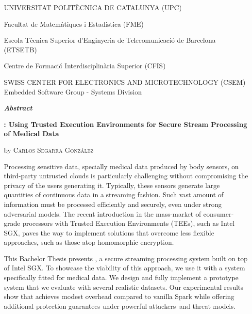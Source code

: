 \vspace*{0.5cm}
\begin{center}
    \large
    UNIVERSITAT POLIT\`ECNICA DE CATALUNYA (UPC) 

    \normalsize
    Facultat de Matem\`atiques i Estad\'istica (FME)

    Escola T\`ecnica Superior d'Enginyeria de Telecomunicaci\'o de Barcelona (ETSETB)

    Centre de Formaci\'o Interdisciplin\`aria Superior (CFIS)

    \vspace{0.5cm}

    \large
    SWISS CENTER FOR ELECTRONICS AND MICROTECHNOLOGY (CSEM)
    \normalsize
    Embedded Software Group - Systems Division
    
    \vspace{0.5cm}

    \LARGE
    \textit{\textbf{Abstract}} \label{sec:abstract}

    \vspace{0.5cm}

    \large
    \textbf{\projName: Using Trusted Execution Environments for Secure Stream Processing of Medical Data}

    by \textsc{Carlos Segarra Gonz\'alez}
\end{center}

\vspace{0.5cm}

\normalsize
Processing sensitive data, specially medical data produced by body sensors, on third-party untrusted clouds is particularly challenging without compromising the privacy of the users generating it. Typically, these sensors generate large quantities of continuous data in a streaming fashion. Such vast amount of information must be processed efficiently and securely, even under strong adversarial models. The recent introduction in the mass-market of consumer-grade processors with Trusted Execution Environments (TEEs), such as Intel SGX, paves the way to implement solutions that overcome less flexible approaches, such as those atop homomorphic encryption. 
    
This Bachelor Thesis presents \projName, a secure streaming processing system built on top of Intel SGX. To showcase the viability of this approach, we use it with a system specifically fitted for medical data. We design and fully implement a prototype system that we evaluate with several realistic datasets. Our experimental results show that \projName achieves modest overhead compared to vanilla Spark while offering additional protection guarantees under powerful attackers and threat models.

